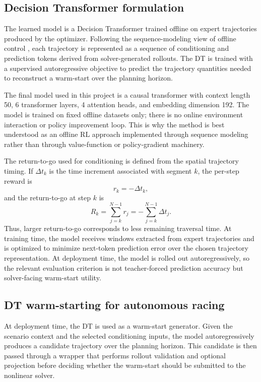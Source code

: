 \subsection{Decision Transformer formulation}

The learned model is a Decision Transformer trained offline on expert trajectories produced by the optimizer. Following the sequence-modeling view of offline control \cite{chen2021decision}, each trajectory is represented as a sequence of conditioning and prediction tokens derived from solver-generated rollouts. The DT is trained with a supervised autoregressive objective to predict the trajectory quantities needed to reconstruct a warm-start over the planning horizon.

The final model used in this project is a causal transformer with context length 50, 6 transformer layers, 4 attention heads, and embedding dimension 192. The model is trained on fixed offline datasets only; there is no online environment interaction or policy improvement loop. This is why the method is best understood as an offline RL approach implemented through sequence modeling rather than through value-function or policy-gradient machinery.

The return-to-go used for conditioning is defined from the spatial trajectory timing. If $\Delta t_k$ is the time increment associated with segment $k$, the per-step reward is
\[
r_k = -\Delta t_k,
\]
and the return-to-go at step $k$ is
\[
R_k = \sum_{j=k}^{N-1} r_j = -\sum_{j=k}^{N-1}\Delta t_j.
\]
Thus, larger return-to-go corresponds to less remaining traversal time. At training time, the model receives windows extracted from expert trajectories and is optimized to minimize next-token prediction error over the chosen trajectory representation. At deployment time, the model is rolled out autoregressively, so the relevant evaluation criterion is not teacher-forced prediction accuracy but solver-facing warm-start utility.

\subsection{DT warm-starting for autonomous racing}

At deployment time, the DT is used as a warm-start generator. Given the scenario context and the selected conditioning inputs, the model autoregressively produces a candidate trajectory over the planning horizon. This candidate is then passed through a wrapper that performs rollout validation and optional projection before deciding whether the warm-start should be submitted to the nonlinear solver.

